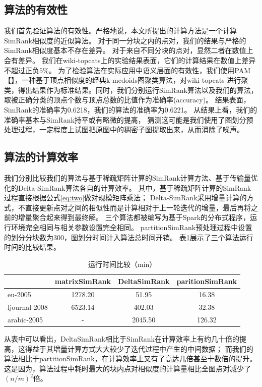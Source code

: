 \documentclass[master]{njuthesis}
\begin{document}
\subsection{算法的有效性}
我们首先验证算法的有效性。严格地说，本文所提出的计算方法是一个计算SimRank相似度的近似算法。
对于同一分块之内的点对，我们的结果与严格的SimRank相似度基本不存在差异。
对于来自不同分块的点对，显然二者在数值上会有差异。
我们在wiki-topcats上的实验结果表面，它们的计算结果在数值上差异不超过正负$5\%$。
为了检验算法在实际应用中语义层面的有效性，我们使用PAM【】，一种基于顶点相似度的经典k-medoids图聚类算法，对wiki-topcats
进行聚类，得出结果作为标准结果。同时，我们分别运行SimRank算法以及我们的算法，取被正确分类的顶点个数与顶点总数的比值作为准确率(accuracy)。
结果表面，SimRank的准确率为0.6218，我们的算法的准确率为0.6221。
从结果上看，我们的准确率基本与SimRank持平或有略微的提高，
猜测这可能是我们使用了图划分预处理过程，一定程度上试图把原图中的稠密子图提取出来，从而消除了噪声。

\subsection{算法的计算效率}
我们分别比较我们的算法与基于稀疏矩阵计算的SimRank计算方法、基于传输量优化的Delta-SimRank算法各自的计算效率。
其中，基于稀疏矩阵计算的SimRank过程直接根据公式\ref{eq:two}做对规模矩阵乘法；
Delta-SimRank\cite{cao2012delta}采用增量计算的方式，不直接更新点对之间的相似性而是计算相对于上一轮迭代的增量，最后再将之前的增量聚合起来得到最终解。
三个算法都被编写为基于Spark的分布式程序，运行环境完全相同与相关参数设置完全相同。
partitionSimRank预处理过程中设置的划分分块数为300，图划分时间计入算法总时间开销。
表\ref{tab:cha3_time}展示了三个算法运行时间的比较结果。
\begin{table}[ht]
\caption{运行时间比较（min）}
\label{tab:cha3_time}
\centering
\begin{tabular}{|l|c|c|c|}
\hline
& \textbf{matrixSimRank} & \textbf{DeltaSimRank} & \textbf{paritionSimRank} \\
\hline
eu-2005 & \num{1278.20} & \num{51.95}          & \num{16.38}       \\
\hline
ljournal-2008     & \num{6523.14}  & \num{402.03 }          & \num{32.38}    \\
\hline
arabic-2005  & - & \num{2045.50}         & \num{126.32}    \\
\hline
\end{tabular}
\end{table}
从表中可以看出，DeltaSimRank相比于SimRank在计算效率上有约几十倍的提高，这得益于其增量计算方式大大较少了迭代过程中产生的中间数据；
而我们的算法相比于partitionSimRank，在计算效率上又有了高达几倍甚至十数倍的提升。
这是因为，算法过程中耗时最大的块内点对相似度的计算量相比全图点对减少了$(n/m)^2$倍。
\end{document}
